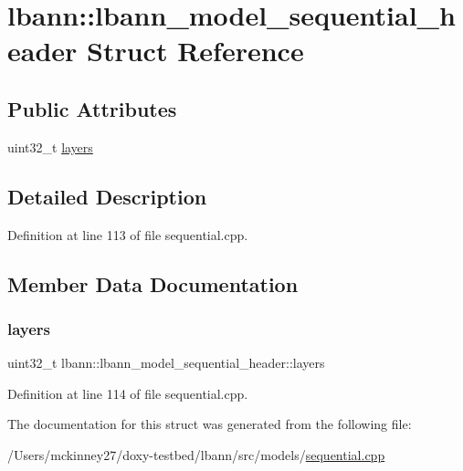 \hypertarget{structlbann_1_1lbann__model__sequential__header}{}\section{lbann\+:\+:lbann\+\_\+model\+\_\+sequential\+\_\+header Struct Reference}
\label{structlbann_1_1lbann__model__sequential__header}
\subsection*{Public Attributes}
\begin{DoxyCompactItemize}
\item 
uint32\+\_\+t \hyperlink{structlbann_1_1lbann__model__sequential__header_ae22b167ec56716841a472cfaab5e94bb}{layers}
\end{DoxyCompactItemize}


\subsection{Detailed Description}


Definition at line 113 of file sequential.\+cpp.



\subsection{Member Data Documentation}
\mbox{\label{structlbann_1_1lbann__model__sequential__header_ae22b167ec56716841a472cfaab5e94bb}} 
\subsubsection{\texorpdfstring{layers}{layers}}
{\footnotesize\ttfamily uint32\+\_\+t lbann\+::lbann\+\_\+model\+\_\+sequential\+\_\+header\+::layers}



Definition at line 114 of file sequential.\+cpp.



The documentation for this struct was generated from the following file\+:\begin{DoxyCompactItemize}
\item 
/\+Users/mckinney27/doxy-\/testbed/lbann/src/models/\hyperlink{sequential_8cpp}{sequential.\+cpp}\end{DoxyCompactItemize}
